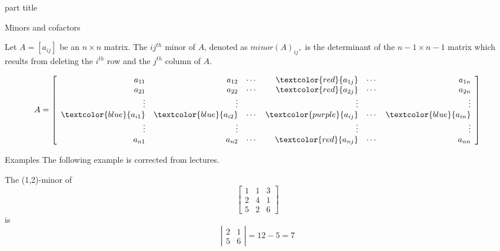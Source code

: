 \documentclass{beamer}
\begin{document}
\begin{frame}
  \begin{beamercolorbox}[sep=12pt,center]{part title}
    \insertsection\par
  \end{beamercolorbox}
\end{frame}

\begin{frame}{Minors and cofactors}
  \begin{definition}
    Let $A = \left[a_{ij} \right]$ be an $n \times n$ matrix. 
    The \alert{$ij^{th}$ minor} of $A$, denoted as
    $minor\left( A\right) _{ij},$ is the determinant
    of the $n-1 \times n-1$ matrix which results from deleting the $i^{th}$ row and
    the $j^{th}$ column of $A$.
  \end{definition}

  \[
    A=
    \left[
      \begin{array}{rrrrrr}
        a_{11} & a_{12} & \cdots & \textcolor{red}{a_{1j}} & \cdots & a_{1n} \\
        a_{21} & a_{22} & \cdots & \textcolor{red}{a_{2j}} & \cdots & a_{2n} \\
        \vdots & \vdots & & \vdots & & \vdots \\
        \textcolor{blue}{a_{i1}} & \textcolor{blue}{a_{i2}} & \cdots & \textcolor{purple}{a_{ij}} & \cdots & \textcolor{blue}{a_{in}} \\
        \vdots & \vdots & & \vdots & & \vdots \\
        a_{n1} & a_{n2} & \cdots & \textcolor{red}{a_{nj}} & \cdots & a_{nn}
      \end{array}
    \right] 
  \]
\end{frame}

\begin{frame}{Examples}
  \alert{The following example is corrected from lectures.}
  \begin{example}
    The (1,2)-minor of
    \begin{equation*}
      \left[
	\begin{array}{ccc}
          1&1&3\\
          2&4&1\\
          5&2&6
	\end{array}
      \right]
    \end{equation*}
    is
    \begin{equation*}
      \left|
        \begin{array}{ccc}
          2&1\\
          5&6
	\end{array}
      \right| = 12-5 = 7
    \end{equation*}
  \end{example}
\end{frame}
\end{document}
